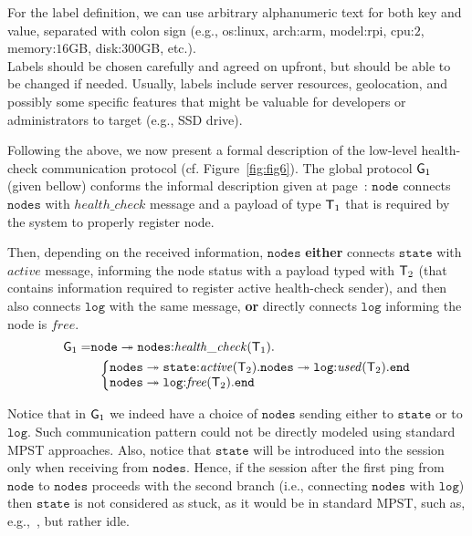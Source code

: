 \noindent
For the label definition, we can use arbitrary alphanumeric text for both key and value, separated with colon sign (e.g.,  os:linux, arch:arm, model:rpi, cpu:$2$, memory:$16$GB, disk:$300$GB, etc.).\\

Labels should be chosen carefully and agreed on upfront, but should be able to be changed if needed. Usually, labels include server resources, geolocation, and possibly some specific features that might be valuable for developers or administrators to target (e.g., SSD drive).

Following the above, we now present a formal description of the low-level health-check communication protocol (cf. Figure~\ref{fig:fig6}). 
The global protocol ${\sf G}_1$ (given bellow) conforms the informal description given at 
page~\pageref{informal_description_health-check}: $\mathtt{node}$ connects $\mathtt{nodes}$ with $\mathit{health{\_}check}$ message and a payload of type ${\mathsf T}_1$ that is required by the system to properly register node. 

Then, depending on the received information, $\mathtt{nodes}$ {\bf either} connects $\mathtt{state}$ with $\mathit{active}$ 
message, informing the node status with a payload typed with ${\mathsf T}_2$ (that contains information required to register active health-check sender),
and then also connects $\mathtt{log}$ with the same message, 
{\bf or} directly connects $\mathtt{log}$ informing the node is $\mathit{free}$.
\begin{align*}
\G_1 = & 
\mathtt{node} \twoheadrightarrow \mathtt{nodes}{:}\mathit{health{\_}check}(\T_1).\\
& \hspace{2mm}
\left\{
\begin{array}{@{}l@{}}
\mathtt{nodes} \twoheadrightarrow \mathtt{state}{:}\mathit{active}(\T_2).\mathtt{nodes}\twoheadrightarrow \mathtt{log}{:}\mathit{used}(\T_2).\tend\\
\mathtt{nodes}\twoheadrightarrow \mathtt{log}{:}\mathit{free}(\T_2).\tend
\end{array} \right.
\end{align*}

Notice that in ${\sf G}_1$ we indeed have a choice of $\mathtt{nodes}$ sending either to $\mathtt{state}$ or to $\mathtt{log}$. Such communication pattern could not be directly modeled using standard MPST approaches. 
Also, notice that $\mathtt{state}$ will be introduced into the session only when receiving from $\mathtt{nodes}$. 
Hence, if the session after the first ping from $\mathtt{node}$ to $\mathtt{nodes}$ proceeds with the second branch (i.e., connecting $\mathtt{nodes}$ with $\mathtt{log}$) then $\mathtt{state}$ is not considered as stuck, as it would be in standard MPST, such as, e.g.,~\cite{HondaYC08}, but rather idle. 


